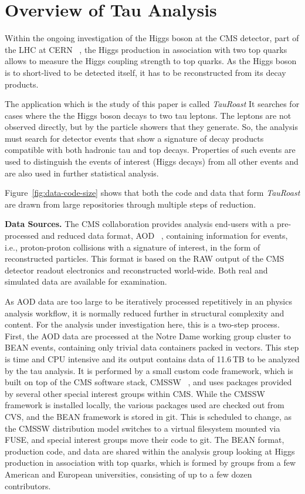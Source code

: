 \documentclass{sig-alternate}
\begin{document}
\section{Overview of Tau Analysis}

Within the ongoing investigation of the Higgs boson at the CMS
detector, part of the LHC at CERN ~\cite{collaboration2008cms}, the Higgs production in association
with two top quarks allows to measure the Higgs coupling strength to
top quarks.  As the Higgs boson is to short-lived to be detected
itself, it has to be reconstructed from its decay products.

The application which is the study of this paper is called \emph{TauRoast}
It searches for cases where the the Higgs boson decays to two tau leptons.
The leptons are not observed directly, but by the particle showers
that they generate.  So, the analysis must search for detector
events that show a signature of decay products compatible with both hadronic tau and top decays.  Properties of such events are used to distinguish
the events of interest (Higgs decays) from all other events and
are also used in further statistical analysis.

Figure~\ref{fig:data-code-size} shows that both the code and data
that form \emph{TauRoast} are drawn from large repositories through
multiple steps of reduction.

{\bf Data Sources.}
The CMS collaboration provides analysis end-users with a pre-processed
and reduced data format, AOD ~\cite{holtman2001cms}, containing information for events, i.e.,
proton-proton collisions with a signature of interest, in the form of
reconstructed particles.  This format is based on the RAW output of
the CMS detector readout electronics and reconstructed world-wide.
Both real and simulated data are available for examination.

As AOD data are too large to be iteratively processed repetitively in
an physics analysis workflow, it is normally reduced further in
structural complexity and content.  For the analysis under
investigation here, this is a two-step process.  First, the AOD data
are processed at the Notre Dame working group cluster to BEAN events,
containing only trivial data containers packed in vectors.  This step
is time and CPU intensive and its output contains data of 11.6$\,$TB to be
analyzed by the tau analysis.
It is performed by a small custom code framework,
which is built on top of the CMS software stack, CMSSW ~\cite{cms2006cmssw},
and uses packages provided by several other special interest groups within CMS.
While the CMSSW framework is installed locally,
the various packages used are checked out from CVS,
and the BEAN framework is stored in git.
This is scheduled to change,
as the CMSSW distribution model switches to a virtual filesystem mounted via FUSE,
and special interest groups move their code to git.
The BEAN format, production code, and
data are shared within the analysis group looking at Higgs production
in association with top quarks, which is formed by groups from a few
American and European universities,
consisting of up to a few dozen contributors.
\end{document}
